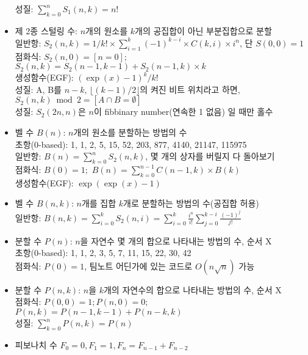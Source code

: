 \begin{itemize}[noitemsep]
    성질: $\sum_{k=0}^{n} S_1(n,k) = n!$
    \item 제 2종 스털링 수: $n$개의 원소를 $k$개의 공집합이 아닌 부분집합으로 분할\\
    일반항: $S_2(n, k) = 1/k! \times \sum_{i=1}^{k} (-1)^{k-i} \times C(k, i) \times i^n$, 단 $S(0,0)=1$\\
    점화식: $S_2(n,0)=[n=0];$ $S_2(n,k) = S_2(n-1, k-1) + S_2(n-1, k) \times k$\\
    생성함수(EGF): $(\exp(x)-1)^k / k!$\\
    성질: A, B를 $n-k$, $\lfloor (k-1)/2 \rfloor$의 켜진 비트 위치라고 하면, $S_2(n, k) \bmod 2 = [A \cap B = \emptyset]$\\
    성질: $S_2(2n,n)$은 $n$이 fibbinary number(연속한 1 없음) 일 때만 홀수
    \item 벨 수 $B(n)$: $n$개의 원소를 분할하는 방법의 수\\
    초항(0-based): 1, 1, 2, 5, 15, 52, 203, 877, 4140, 21147, 115975\\
    일반항: $B(n) = \sum_{k=0}^{n} S_2(n, k)$, 몇 개의 상자를 버릴지 다 돌아보기\\
    점화식: $B(0)=1;$ $B(n) = \sum_{k=0}^{n-1} C(n-1, k) \times B(k)$\\
    생성함수(EGF): $\exp(\exp(x)-1)$
    \item 벨 수 $B(n, k)$: $n$개를 집합 $k$개로 분할하는 방법의 수(공집합 허용)\\
    일반항: $B(n, k) = \sum_{i=0}^{k} S_2(n, i) = \sum_{i=0}^k \frac{i^n}{i!}\sum_{j=0}^{k-i} \frac{(-1)^j}{j!}$
    \item 분할 수 $P(n)$: $n$을 자연수 몇 개의 합으로 나타내는 방법의 수, 순서 X\\
    초항(0-based): 1, 1, 2, 3, 5, 7, 11, 15, 22, 30, 42\\
    점화식: $P(0) = 1$, 팀노트 어딘가에 있는 코드로 $O(n \sqrt n)$ 가능
    \item 분할 수 $P(n,k)$: $n$을 $k$개의 자연수의 합으로 나타내는 방법의 수, 순서 X\\
    점화식: $P(0,0) = 1; P(n,0) = 0;$ $P(n,k) = P(n-1, k-1) + P(n-k, k)$\\
    성질: $\sum_{k=0}^{n} P(n, k) = P(n)$
    \item 피보나치 수 $F_{0}=0, F_{1}=1, F_n = F_{n-1} + F_{n-2}$\\

\end{itemize}
